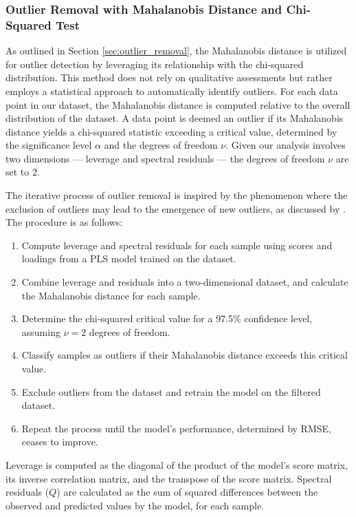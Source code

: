 \subsubsection{Outlier Removal with Mahalanobis Distance and Chi-Squared Test}\label{sec:methodology_outlier_removal}

As outlined in Section \ref{sec:outlier_removal}, the Mahalanobis distance is utilized for outlier detection by leveraging its relationship with the chi-squared distribution.
This method does not rely on qualitative assessments but rather employs a statistical approach to automatically identify outliers.
For each data point in our dataset, the Mahalanobis distance is computed relative to the overall distribution of the dataset.
A data point is deemed an outlier if its Mahalanobis distance yields a chi-squared statistic exceeding a critical value, determined by the significance level $\alpha$ and the degrees of freedom $\nu$.
Given our analysis involves two dimensions --- leverage and spectral residuals --- the degrees of freedom $\nu$ are set to 2.

The iterative process of outlier removal is inspired by the phenomenon where the exclusion of outliers may lead to the emergence of new outliers, as discussed by \citet{cleggRecalibrationMarsScience2017}.
The procedure is as follows:
\begin{enumerate}
\item Compute leverage and spectral residuals for each sample using scores and loadings from a PLS model trained on the dataset.
\item Combine leverage and residuals into a two-dimensional dataset, and calculate the Mahalanobis distance for each sample.
\item Determine the chi-squared critical value for a 97.5\% confidence level, assuming $\nu = 2$ degrees of freedom.
\item Classify samples as outliers if their Mahalanobis distance exceeds this critical value.
\item Exclude outliers from the dataset and retrain the model on the filtered dataset.
\item Repeat the process until the model's performance, determined by RMSE, ceases to improve.
\end{enumerate}

Leverage is computed as the diagonal of the product of the model's score matrix, its inverse correlation matrix, and the transpose of the score matrix.
Spectral residuals ($Q$) are calculated as the sum of squared differences between the observed and predicted values by the model, for each sample.

